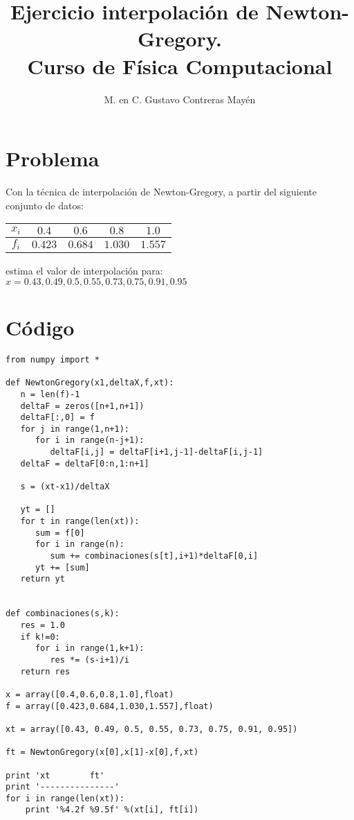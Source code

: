 \documentclass[11pt]{article}
\title{Ejercicio interpolaci\'{o}n de Newton-Gregory. \\ Curso de Física Computacional}
\author{M. en C. Gustavo Contreras Mayén}
\date{ }
\begin{document}
\maketitle
\fontsize{14}{14}\selectfont
\section{Problema}
\begin{frame}
Con la t\'{e}cnica de interpolaci\'{o}n de Newton-Gregory, a partir del siguiente conjunto de datos:
\begin{table}[H]
\centering \Large
\begin{tabulary}{15cm}{c | c | c | c | c }
$x_{i}$ & $0.4$ & $0.6$ & $0.8$ & $1.0$ \\
\midrule $f_{i}$ & $0.423$ & $0.684$ & $1.030$ & $1.557$ 
\end{tabulary}
\end{table}
estima el valor de interpolaci\'{o}n para:\\ $x=0.43,0.49,0.5,0.55,0.73, 0.75, 0.91, 0.95$
\end{frame}
\section{C\'{o}digo}
\begin{lstlisting}
from numpy import *

def NewtonGregory(x1,deltaX,f,xt):
   n = len(f)-1
   deltaF = zeros([n+1,n+1])
   deltaF[:,0] = f
   for j in range(1,n+1):
      for i in range(n-j+1):
         deltaF[i,j] = deltaF[i+1,j-1]-deltaF[i,j-1]
   deltaF = deltaF[0:n,1:n+1]

   s = (xt-x1)/deltaX

   yt = []
   for t in range(len(xt)):
      sum = f[0]
      for i in range(n):
         sum += combinaciones(s[t],i+1)*deltaF[0,i]
      yt += [sum]
   return yt


def combinaciones(s,k):
   res = 1.0
   if k!=0:
      for i in range(1,k+1):
         res *= (s-i+1)/i
   return res

x = array([0.4,0.6,0.8,1.0],float)
f = array([0.423,0.684,1.030,1.557],float)

xt = array([0.43, 0.49, 0.5, 0.55, 0.73, 0.75, 0.91, 0.95])

ft = NewtonGregory(x[0],x[1]-x[0],f,xt)

print 'xt        ft'
print '---------------'
for i in range(len(xt)):
    print '%4.2f %9.5f' %(xt[i], ft[i])
\end{lstlisting}
\end{document}
